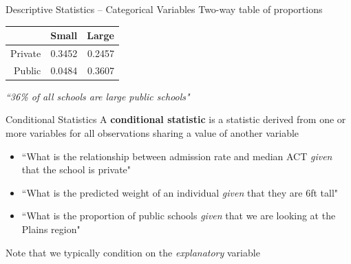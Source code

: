 \documentclass{beamer}
\begin{document}
\begin{frame}{Descriptive Statistics -- Categorical Variables}
Two-way table of proportions

\begin{table}[ht]
\centering
\begin{tabular}{rrr}
  \hline
 & Small & Large \\ 
  \hline
Private & 0.3452 & 0.2457 \\ 
  Public & 0.0484 & 0.3607 \\  
   \hline
\end{tabular}
\end{table}


\textit{``36\% of all schools are large public schools"}
\end{frame}

\begin{frame}{Conditional Statistics}
A \textbf{conditional statistic} is a statistic derived from one or more variables for all observations sharing a value of another variable \vspace{2mm}
\begin{itemize}
	\item ``What is the relationship between admission rate and median ACT \textit{given} that the school is private"
	\item ``What is the predicted weight of an individual \textit{given} that they are 6ft tall"
	\item ``What is the proportion of public schools \textit{given} that we are looking at the Plains region"
\end{itemize}
\vspace{4mm}
Note that we typically condition on the \textit{explanatory} variable
\end{frame}
\end{document}
